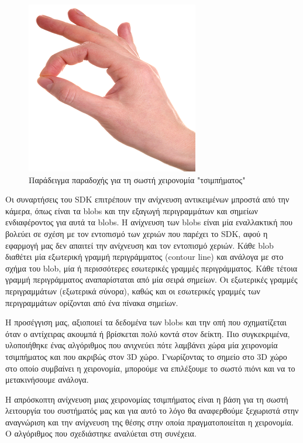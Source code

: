 \begin{figure}[H]
    \centering
    \includegraphics[scale=0.6, angle=0]{Files/Figures/correct_pinch.jpg}
    \caption[Παράδειγμα παραδοχής για τη σωστή χειρονομία "τσιμπήματος"]{Παράδειγμα παραδοχής για τη σωστή χειρονομία "τσιμπήματος"}
    \label{fig:gesture_rec}
\end{figure}



Οι συναρτήσεις του SDK επιτρέπουν την ανίχνευση αντικειμένων μπροστά από την κάμερα, όπως είναι τα blobs και την εξαγωγή περιγραμμάτων και σημείων ενδιαφέροντος για αυτά τα blobs. Η ανίχνευση των blobs είναι μία εναλλακτική που βολεύει σε σχέση με τον εντοπισμό των χεριών που παρέχει το SDK, αφού η εφαρμογή μας δεν απαιτεί την ανίχνευση και τον εντοπισμό χεριών. Κάθε blob διαθέτει μία εξωτερική γραμμή περιγράμματος (contour line) και ανάλογα με στο σχήμα του blob, μία ή περισσότερες εσωτερικές γραμμές περιγράμματος. Κάθε τέτοια γραμμή περιγράμματος αναπαρίσταται από μία σειρά σημείων. Οι εξωτερικές γραμμές περιγραμμάτων (εξωτερικά σύνορα), καθώς και οι εσωτερικές γραμμές των περιγραμμάτων ορίζονται από ένα πίνακα σημείων.


Η προσέγγιση μας, αξιοποιεί τα δεδομένα των blobs και την οπή που σχηματίζεται όταν ο αντίχειρας ακουμπά ή βρίσκεται πολύ κοντά στον δείκτη. Πιο συγκεκριμένα, υλοποιήθηκε ένας αλγόριθμος που ανιχνεύει πότε λαμβάνει χώρα μία χειρονομία τσιμπήματος και που ακριβώς στον 3D χώρο. Γνωρίζοντας το σημείο στο 3D χώρο στο οποίο συμβαίνει η χειρονομία, μπορούμε να επιλέξουμε το σωστό πιόνι και να το μετακινήσουμε ανάλογα. 


Η απρόσκοπτη ανίχνευση μιας χειρονομίας τσιμπήματος είναι η βάση για τη σωστή λειτουργία του συστήματός μας και για αυτό το λόγο θα αναφερθούμε ξεχωριστά στην αναγνώριση και την ανίχνευση της θέσης στην οποία πραγματοποιείται η χειρονομία. Ο αλγόριθμος που σχεδιάστηκε αναλύεται στη συνέχεια.



